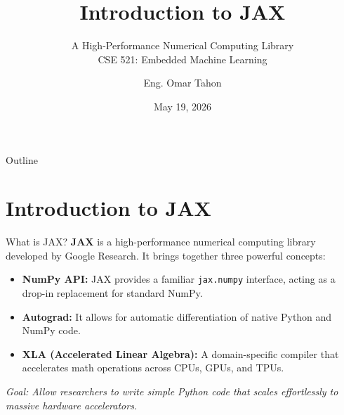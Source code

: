\documentclass[aspectratio=169]{beamer}
\title[Introduction to JAX]{Introduction to JAX}
\subtitle{A High-Performance Numerical Computing Library\\ CSE 521: Embedded Machine Learning}
\author{Eng. Omar Tahon}
\date{May 19, 2026}
\begin{document}
\begin{frame}
    \titlepage
\end{frame}

\begin{frame}{Outline}
    \tableofcontents
\end{frame}

\section{Introduction to JAX}

\begin{frame}{What is JAX?}
    \textbf{JAX} is a high-performance numerical computing library developed by Google Research. It brings together three powerful concepts:

    \vspace{0.3cm}
    \begin{itemize}
        \item \textbf{NumPy API:} JAX provides a familiar \texttt{jax.numpy} interface, acting as a drop-in replacement for standard NumPy.
        \item \textbf{Autograd:} It allows for automatic differentiation of native Python and NumPy code.
        \item \textbf{XLA (Accelerated Linear Algebra):} A domain-specific compiler that accelerates math operations across CPUs, GPUs, and TPUs.
    \end{itemize}

    \vspace{0.3cm}
    \textit{Goal: Allow researchers to write simple Python code that scales effortlessly to massive hardware accelerators.}
\end{frame}
\end{document}
